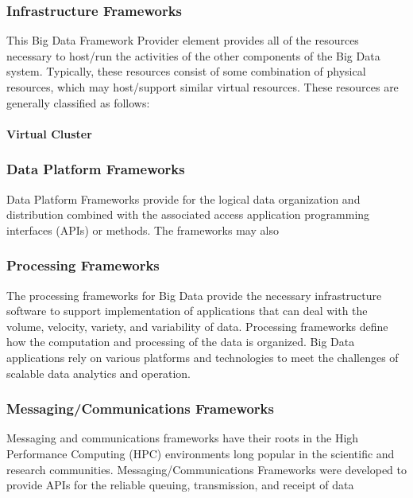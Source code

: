 \documentclass[11pt]{article}
\begin{document}
\subsubsection{Infrastructure Frameworks}

This Big Data Framework Provider element provides all of the resources necessary to host/run the 
activities of the other components of the Big Data system. Typically, these resources consist of some 
combination of physical resources, which may host/support similar virtual resources. These resources are 
generally classified as follows:

\paragraph{Virtual Cluster}

\begin{quote}

\end{quote}

\subsubsection{Data Platform Frameworks}

Data Platform Frameworks provide for the logical data organization and distribution combined with the 
associated access application programming interfaces (APIs) or methods. The frameworks may also 

\subsubsection{Processing Frameworks}

The processing frameworks for Big Data provide the necessary infrastructure software to support 
implementation of applications that can deal with the volume, velocity, variety, and variability of data. 
Processing frameworks define how the computation and processing of the data is organized. Big Data 
applications rely on various platforms and technologies to meet the challenges of scalable data analytics 
and operation. 

\subsubsection{Messaging/Communications Frameworks}

Messaging and communications frameworks have their roots in the High Performance Computing (HPC) 
environments long popular in the scientific and research communities. Messaging/Communications 
Frameworks were developed to provide APIs for the reliable queuing, transmission, and receipt of data 
\end{document}
